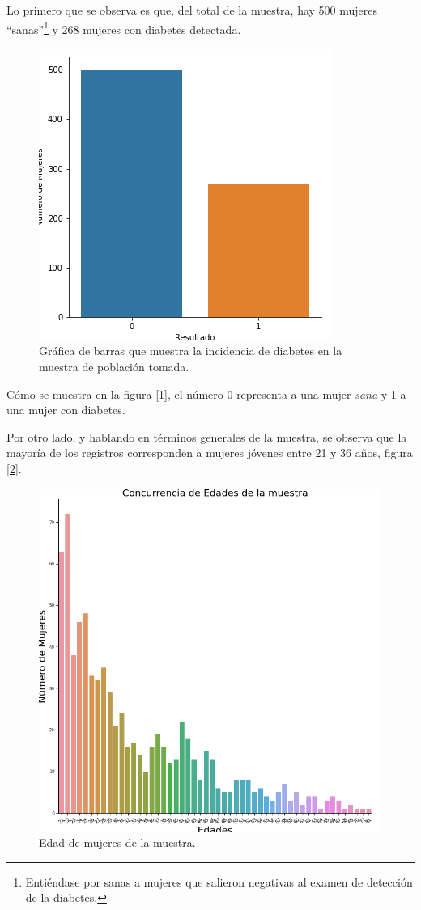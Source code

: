 \documentclass{article}
\begin{document}
Lo primero que se observa es que, del total de la muestra, hay 500 mujeres ``sanas''\footnote{Entiéndase por sanas a mujeres que salieron negativas al examen de detección de la diabetes.} y 268 mujeres con diabetes detectada.

\begin{figure}[H]
	\centering
	\includegraphics[width=0.65\linewidth]{bar_diabetes.png}
	\caption{Gráfica de barras que muestra la incidencia de diabetes en la muestra de población tomada.}%
	\label{fig:bar_diabetes}
\end{figure}

Cómo se muestra en la figura [\ref{fig:bar_diabetes}], el número 0 representa a una mujer \emph{sana} y 1 a una mujer con diabetes.

Por otro lado, y hablando en términos generales de la muestra, se observa que la mayoría de los registros corresponden a mujeres jóvenes entre 21 y 36 años, figura [\ref{fig:edad_muestra}]. 

\begin{figure}[H]
	\centering
	\includegraphics[width=0.65\linewidth]{edad_muestra.png}
	\caption{Edad de mujeres de la muestra.}%
	\label{fig:edad_muestra}
\end{figure}
\end{document}
